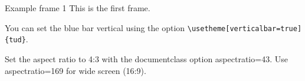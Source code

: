 \begin{frame}[fragile]{Example frame 1} %
    This is the first frame.
    
    You can set the blue bar vertical using the option \verb|\usetheme[verticalbar=true]{tud}|.
    
    Set the aspect ratio to 4:3 with the
    documentclass option aspectratio=43. Use aspectratio=169 for wide screen (16:9).
\end{frame}
